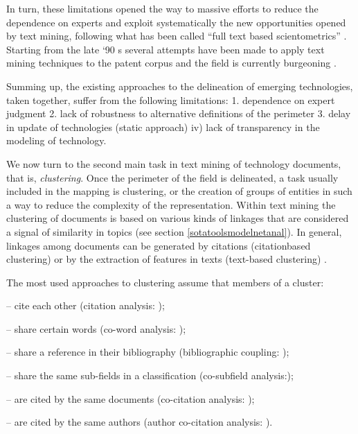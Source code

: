\documentclass[]{book}
\begin{document}
In turn, these limitations opened the way to massive efforts to reduce
the dependence on experts and exploit systematically the new
opportunities opened by text mining, following what has been called
``full text based scientometrics'' \citep{boyack2013improving}. Starting
from the late `90 s several attempts have been made to apply text mining
techniques to the patent corpus and the field is currently burgeoning
\citep{joung2017monitoring, ozcan2017patent}.

Summing up, the existing approaches to the delineation of emerging
technologies, taken together, suffer from the following limitations: 1.
dependence on expert judgment 2. lack of robustness to alternative
definitions of the perimeter 3. delay in update of technologies (static
approach) iv) lack of transparency in the modeling of technology.

We now turn to the second main task in text mining of technology
documents, that is, \emph{clustering}. Once the perimeter of the field
is delineated, a task usually included in the mapping is clustering, or
the creation of groups of entities in such a way to reduce the
complexity of the representation. Within text mining the clustering of
documents is based on various kinds of linkages that are considered a
signal of similarity in topics (see section
\ref{sotatoolsmodelnetanal}). In general, linkages among documents can
be generated by citations (citationbased clustering) or by the
extraction of features in texts (text-based clustering)
\citep{leydesdorff2006measuring, wang2017clustering, jaffe1993geographic}.

The most used approaches to clustering assume that members of a cluster:

-- cite each other (citation analysis:
\citep{jaffe1993geographic, moed2006citation, verspagen2007mapping, lee2017knowledge});

-- share certain words (co-word analysis:
\citep{callon1983translations, rip1984co, leydesdroff1989words, engelsman1994patent, van1993neural, yoon2004text});

-- share a reference in their bibliography (bibliographic coupling:
\citep{glanzel1996new, kuusi2007anticipating});

-- share the same sub-fields in a classification (co-subfield
analysis:\citep{chang2009using});

-- are cited by the same documents (co-citation analysis:
\citep{small1973co, small1985clustering});

-- are cited by the same authors (author co-citation analysis:
\citep{white1981author}).
\end{document}
